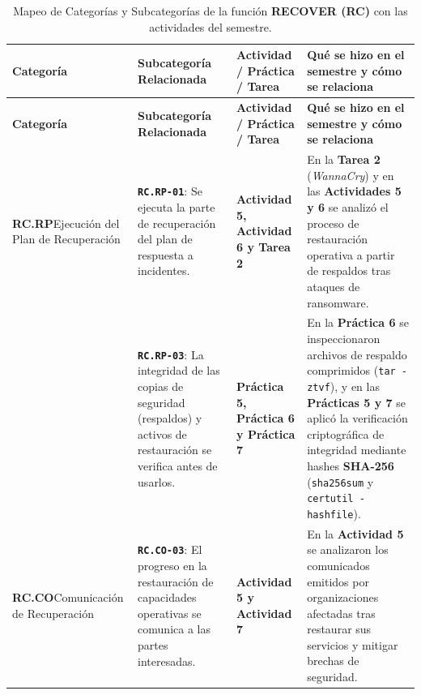 \documentclass[letterpaper,11pt]{article}
\begin{document}
\begingroup
\scriptsize
\setlength{\tabcolsep}{4pt}
\renewcommand{\arraystretch}{1.24}
\begin{longtable}{|L{2.8cm}|L{4.5cm}|L{2.9cm}|L{6.5cm}|}
\caption{Mapeo de Categorías y Subcategorías de la función \textbf{RECOVER (RC)} con las actividades del semestre.}
\label{tab:mapeo-rc} \\
\hline
{}
\textbf{Categoría} & \textbf{Subcategoría Relacionada} & \textbf{Actividad / Práctica / Tarea} & \textbf{Qué se hizo en el semestre y cómo se relaciona} \\
\hline
\endfirsthead
\hline
{}
\textbf{Categoría} & \textbf{Subcategoría Relacionada} & \textbf{Actividad / Práctica / Tarea} & \textbf{Qué se hizo en el semestre y cómo se relaciona} \\
\hline
\endhead
\hline
\endfoot

\textbf{RC.RP}\newline Ejecución del Plan de Recuperación &
\textbf{\texttt{RC.RP-01}}: Se ejecuta la parte de recuperación del plan de respuesta a incidentes. &
\textbf{Actividad 5, Actividad 6 y Tarea 2} &
En la \textbf{Tarea 2} (\textit{WannaCry}) y en las \textbf{Actividades 5 y 6} se analizó el proceso de restauración operativa a partir de respaldos tras ataques de ransomware. \\
\nopagebreak
 &
\textbf{\texttt{RC.RP-03}}: La integridad de las copias de seguridad (respaldos) y activos de restauración se verifica antes de usarlos. &
\textbf{Práctica 5, Práctica 6 y Práctica 7} &
En la \textbf{Práctica 6} se inspeccionaron archivos de respaldo comprimidos (\texttt{tar -ztvf}), y en las \textbf{Prácticas 5 y 7} se aplicó la verificación criptográfica de integridad mediante hashes \textbf{SHA-256} (\texttt{sha256sum} y \texttt{certutil -hashfile}). \\
\hline

\textbf{RC.CO}\newline Comunicación de Recuperación &
\textbf{\texttt{RC.CO-03}}: El progreso en la restauración de capacidades operativas se comunica a las partes interesadas. &
\textbf{Actividad 5 y Actividad 7} &
En la \textbf{Actividad 5} se analizaron los comunicados emitidos por organizaciones afectadas tras restaurar sus servicios y mitigar brechas de seguridad. \\
\hline
\end{longtable}
\endgroup

\end{document}
